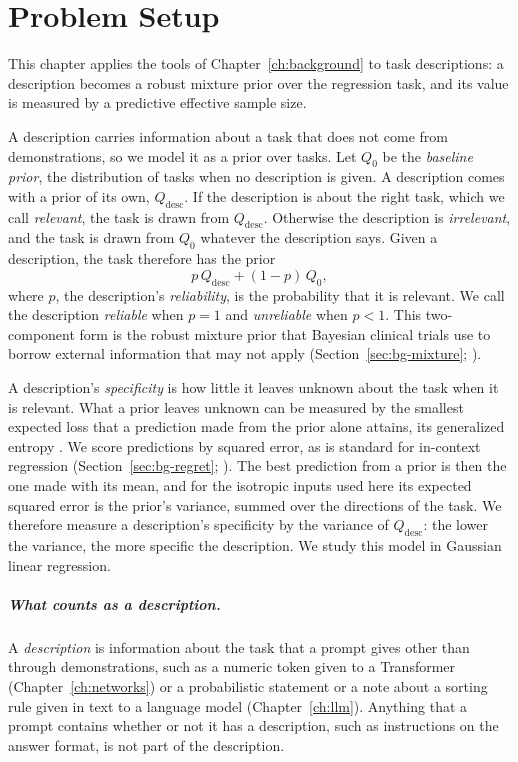 \chapter{Problem Setup}\label{ch:setup}

This chapter applies the tools of Chapter~\ref{ch:background} to task descriptions: a description becomes a robust mixture prior over the regression task, and its value is measured by a predictive effective sample size.

A description carries information about a task that does not come from demonstrations, so we model it as a prior over tasks. Let $Q_0$ be the \emph{baseline prior}, the distribution of tasks when no description is given. A description comes with a prior of its own, $Q_{\mathrm{desc}}$. If the description is about the right task, which we call \emph{relevant}, the task is drawn from $Q_{\mathrm{desc}}$. Otherwise the description is \emph{irrelevant}, and the task is drawn from $Q_0$ whatever the description says. Given a description, the task therefore has the prior
\begin{equation}\label{eq:mixture}
p\,Q_{\mathrm{desc}}+(1-p)\,Q_0,
\end{equation}
where $p$, the description's \emph{reliability}, is the probability that it is relevant. We call the description \emph{reliable} when $p=1$ and \emph{unreliable} when $p<1$. This two-component form is the robust mixture prior that Bayesian clinical trials use to borrow external information that may not apply (Section~\ref{sec:bg-mixture}; \citealp{schmidli2014}).

A description's \emph{specificity} is how little it leaves unknown about the task when it is relevant. What a prior leaves unknown can be measured by the smallest expected loss that a prediction made from the prior alone attains, its generalized entropy \citep{grunwald2004}. We score predictions by squared error, as is standard for in-context regression (Section~\ref{sec:bg-regret}; \citealp{garg2022}). The best prediction from a prior is then the one made with its mean, and for the isotropic inputs used here its expected squared error is the prior's variance, summed over the directions of the task. We therefore measure a description's specificity by the variance of $Q_{\mathrm{desc}}$: the lower the variance, the more specific the description. We study this model in Gaussian linear regression.

\paragraph{What counts as a description.}
A \emph{description} is information about the task that a prompt gives other than through demonstrations, such as a numeric token given to a Transformer (Chapter~\ref{ch:networks}) or a probabilistic statement or a note about a sorting rule given in text to a language model (Chapter~\ref{ch:llm}). Anything that a prompt contains whether or not it has a description, such as instructions on the answer format, is not part of the description.


